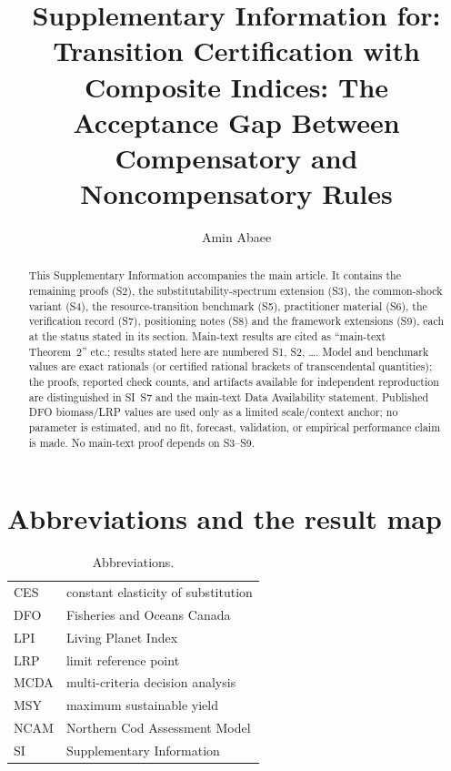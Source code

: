 \documentclass[preprint,11pt,authoryear]{elsarticle}
\theoremstyle{remark}
\begin{document}
\begin{frontmatter}
\title{Supplementary Information for:\\ Transition Certification with Composite Indices: The Acceptance Gap Between Compensatory and Noncompensatory Rules}
\author[1]{Amin Abaee}
\begin{abstract}
This Supplementary Information accompanies the main article. It contains the remaining proofs (S2), the substitutability-spectrum extension (S3), the common-shock variant (S4), the resource-transition benchmark (S5), practitioner material (S6), the verification record (S7), positioning notes (S8) and the framework extensions (S9), each at the status stated in its section. Main-text results are cited as ``main-text Theorem~2'' etc.; results stated here are numbered S1, S2, \dots. Model and benchmark values are exact rationals (or certified rational brackets of transcendental quantities); the proofs, reported check counts, and artifacts available for independent reproduction are distinguished in SI~S7 and the main-text Data Availability statement. Published DFO biomass/LRP values are used only as a limited scale/context anchor; no parameter is estimated, and no fit, forecast, validation, or empirical performance claim is made. No main-text proof depends on S3--S9.
\end{abstract}
\end{frontmatter}

\section{Abbreviations and the result map}

\begin{table}[!htbp]
\centering\small
\caption{Abbreviations.}
\begin{tabular}{@{}ll@{}}
\toprule
CES & constant elasticity of substitution \\
DFO & Fisheries and Oceans Canada \\
LPI & Living Planet Index \\
LRP & limit reference point \\
MCDA & multi-criteria decision analysis \\
MSY & maximum sustainable yield \\
NCAM & Northern Cod Assessment Model \\
SI & Supplementary Information \\
\bottomrule
\end{tabular}
\end{table}
\end{document}
